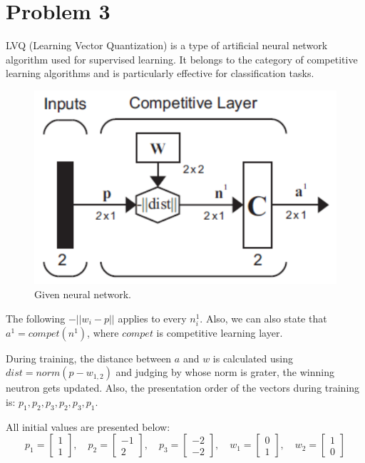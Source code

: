 \section{Problem 3}

LVQ (Learning Vector Quantization) is a type of artificial neural network algorithm used for supervised learning. It belongs to the category of competitive learning algorithms and is particularly effective for classification tasks.

\begin{figure}[htpb]
	\centering
	\includegraphics[width=0.4\linewidth]{../Problem 3/prob3_lvq_nn.png}
	\caption{Given neural network.}
\end{figure}

The following $-||w_i - p||$ applies to every $n^1_i$. Also, we can also state that $a^1 = compet\left(n^1\right)$, where $compet$ is competitive learning layer.

During training, the distance between $a$ and $w$ is calculated using $dist = norm\left(p-w_{1,2}\right)$ and judging by whose norm is grater, the winning neutron gets updated.
Also, the presentation order of the vectors during training is: $p_1, p_2, p_3, p_2, p_3, p_1$.

All initial values are presented below:
\[
p_1 = \left[
\begin{array}{c}
	1\\1
\end{array}
\right], \quad
p_2 = \left[
\begin{array}{c}
	-1\\2
\end{array}
\right], \quad
p_3 = \left[
\begin{array}{c}
	-2\\-2
\end{array}
\right], \quad
w_1 = \left[
\begin{array}{c}
	0\\1
\end{array}
\right], \quad
w_2 = \left[
\begin{array}{c}
	1\\0
\end{array}
\right]
\]

